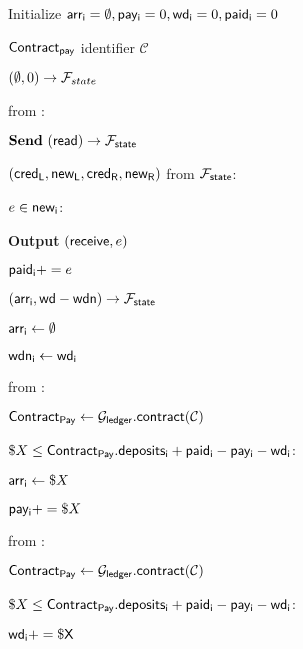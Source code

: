 \begin{bbox}[title=$\Pi_{pay}$]

Initialize ${\mathsf {arr_i}} = \emptyset, {\mathsf {pay_i}} = 0, {\mathsf {wd_i}} = 0, {\mathsf {paid_i}} = 0$

${\mathsf {Contract_{pay}}}$ identifier $\mathcal{C}$ 

\Send $(\emptyset, 0) \rightarrow \mathcal{F}_{state}$

\OnInput {} from \Env:

	\quad $\textbf{Send}~ ({\mathsf {read}}) \rightarrow \mathcal{F}_{{\mathsf {state}}}$

\OnInput $({\mathsf {cred_L}}, {\mathsf {new_L}}, {\mathsf {cred_R}}, {\mathsf {new_R}})$ from $\mathcal{F}_{{\mathsf {state}}}$:

	\quad \For $e \in {\mathsf {new_i}}$:

		\qquad \textbf{Output} $({\mathsf {receive}}, e)$

		\qquad ${\mathsf {paid_i}} += e$
	
	\quad \Send $({\mathsf {arr_i}}, {\mathsf {wd}}-{\mathsf {wdn}}) \rightarrow \mathcal{F}_{{\mathsf {state}}}$

	\quad ${\mathsf {arr_i}} \leftarrow \emptyset$

	\quad ${\mathsf {wdn_i}} \leftarrow {\mathsf {wd_i}}$

\OnInput {} from \Env:

	\quad ${\mathsf {Contract_{Pay}}} \leftarrow \mathcal{G}_{{\mathsf {ledger}}}.{\mathsf {contract}}(\mathcal{C})$

	\quad \If $\$X \leq {\mathsf {Contract_{Pay}}}.{\mathsf {deposits_i}} + {\mathsf {paid_i}} - {\mathsf {pay_i}} - {\mathsf {wd_i}}$:

		\qquad ${\mathsf {arr_i}} \leftarrow \$X$

		\qquad ${\mathsf {pay_i}} += \$X$

\OnInput {} from \Env:

	\quad ${\mathsf {Contract_{Pay}}} \leftarrow \mathcal{G}_{{\mathsf {ledger}}}.{\mathsf {contract}}(\mathcal{C})$

	\quad \If $\$X \leq {\mathsf {Contract_{Pay}}}.{\mathsf {deposits_i}} + {\mathsf {paid_i}} - {\mathsf {pay_i}} - {\mathsf {wd_i}}$:

		\qquad $\sf{wd_i} += \$X$

\end{bbox}
